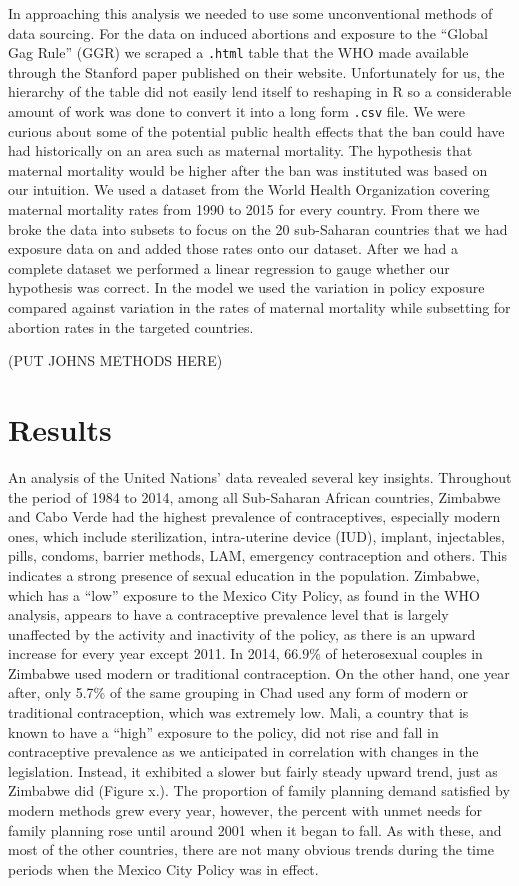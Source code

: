 \documentclass[11pt,]{article}
\begin{document}
In approaching this analysis we needed to use some unconventional
methods of data sourcing. For the data on induced abortions and exposure
to the ``Global Gag Rule'' (GGR) we scraped a \texttt{.html} table that
the WHO made available through the Stanford paper published on their
website. Unfortunately for us, the hierarchy of the table did not easily
lend itself to reshaping in R so a considerable amount of work was done
to convert it into a long form \texttt{.csv} file. We were curious about
some of the potential public health effects that the ban could have had
historically on an area such as maternal mortality. The hypothesis that
maternal mortality would be higher after the ban was instituted was
based on our intuition. We used a dataset from the World Health
Organization covering maternal mortality rates from 1990 to 2015 for
every country. From there we broke the data into subsets to focus on the
20 sub-Saharan countries that we had exposure data on and added those
rates onto our dataset. After we had a complete dataset we performed a
linear regression to gauge whether our hypothesis was correct. In the
model we used the variation in policy exposure compared against
variation in the rates of maternal mortality while subsetting for
abortion rates in the targeted countries.

(PUT JOHNS METHODS HERE)

\section{Results}\label{results}

An analysis of the United Nations' data revealed several key insights.
Throughout the period of 1984 to 2014, among all Sub-Saharan African
countries, Zimbabwe and Cabo Verde had the highest prevalence of
contraceptives, especially modern ones, which include sterilization,
intra-uterine device (IUD), implant, injectables, pills, condoms,
barrier methods, LAM, emergency contraception and others. This indicates
a strong presence of sexual education in the population. Zimbabwe, which
has a ``low'' exposure to the Mexico City Policy, as found in the WHO
analysis, appears to have a contraceptive prevalence level that is
largely unaffected by the activity and inactivity of the policy, as
there is an upward increase for every year except 2011. In 2014, 66.9\%
of heterosexual couples in Zimbabwe used modern or traditional
contraception. On the other hand, one year after, only 5.7\% of the same
grouping in Chad used any form of modern or traditional contraception,
which was extremely low. Mali, a country that is known to have a
``high'' exposure to the policy, did not rise and fall in contraceptive
prevalence as we anticipated in correlation with changes in the
legislation. Instead, it exhibited a slower but fairly steady upward
trend, just as Zimbabwe did (Figure x.). The proportion of family
planning demand satisfied by modern methods grew every year, however,
the percent with unmet needs for family planning rose until around 2001
when it began to fall. As with these, and most of the other countries,
there are not many obvious trends during the time periods when the
Mexico City Policy was in effect.
\end{document}
